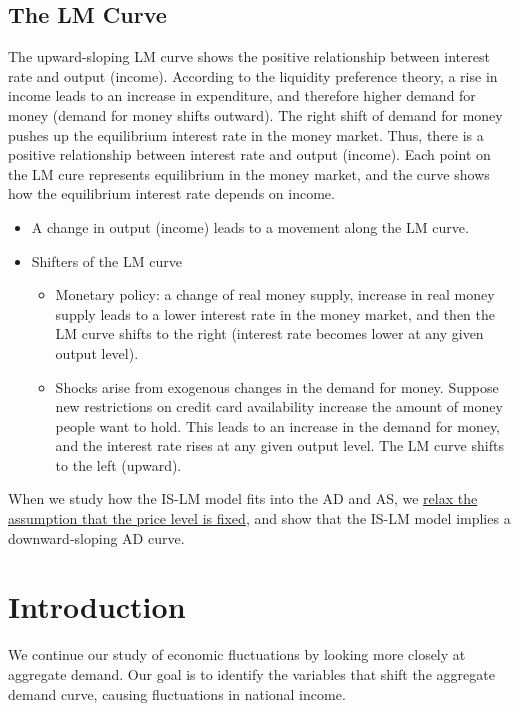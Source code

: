 \documentclass[10pt]{article}
\begin{document}
\subsection{The LM Curve}
The upward-sloping LM curve shows the positive relationship between interest rate and output (income).
According to the liquidity preference theory, a rise in income leads to an increase in expenditure,
and therefore higher demand for money (demand for money shifts outward). The right shift of
demand for money pushes up the equilibrium interest rate in the money market. Thus, there is a 
positive relationship between interest rate and output (income).
Each point on the LM cure represents equilibrium in the money market, and the curve shows how the
equilibrium interest rate depends on income.
\begin{itemize}
\item A change in output (income) leads to a movement along the LM curve.
\item Shifters of the LM curve
		\begin{itemize}
		\item Monetary policy: a change of real money supply, increase in real money supply leads to a 
				lower interest rate in the money market, and then the LM curve shifts to the right
				(interest rate becomes lower at any given output level).
		\item Shocks arise from exogenous changes in the demand for money. Suppose new restrictions
				on credit card availability increase the amount of money people want to hold. This leads
				to an increase in the demand for money, and the interest rate rises at any given output 
				level. The LM curve shifts to the left (upward).
		\end{itemize}
\end{itemize}




When we study how the IS-LM model fits into the AD and AS, we 
{\underline {relax the assumption that the price level is fixed}}, and show that the IS-LM model
implies a downward-sloping AD curve.


\section{Introduction}





We continue our study of economic fluctuations by looking more closely at aggregate demand. Our goal is to identify the variables that shift the aggregate demand curve, causing fluctuations in national income.
\end{document}
